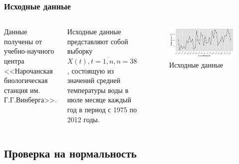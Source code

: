 \documentclass[10pt,pdf,aspectratio=169,hyperref={unicode}]{beamer}
\begin{document}
\begin{frame}
  \frametitle{Исходные данные}
  \begin{columns}[c]
  \column{2in}
  Данные получены от учебно-научного центра <<Нарочанская биологическая станция им. Г.Г.Винберга>>.

  \vspace{0.5em}

  Исходные данные представляют собой выборку $ X(t), t = \overline{1,n}, n = 38 $, состоящую из значений средней температуры воды в июле месяце каждый год в период с 1975 по 2012 годы.
  \column{4in}
  \begin{figure}[h]
    \includegraphics[width=1\linewidth]{../../figures/source.png}
    \caption{Исходные данные}
  \end{figure}
  \end{columns}
\end{frame}

\subsection{Проверка на нормальность}
\end{document}
